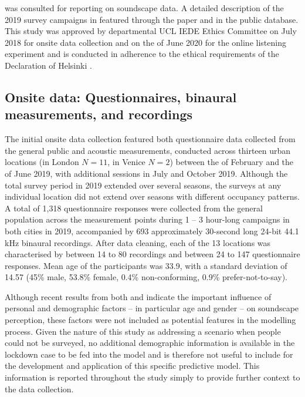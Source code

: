\citet{ISO12913Part2} was consulted for reporting on soundscape data. A detailed description of the 2019 survey campaigns in featured through the paper and in the public database. This study was approved by departmental UCL IEDE Ethics Committee on  July 2018 for onsite data collection and on the  of June 2020 for the online listening experiment and is conducted in adherence to the ethical requirements of the Declaration of Helsinki \citep{WMA2013World}.

 \subsection{Onsite data: Questionnaires, binaural measurements, and recordings}
   The initial onsite data collection featured both questionnaire data collected from the general public and acoustic measurements, conducted across thirteen urban locations (in London $N=11$, in Venice $N=2$) between the  of February and the  of June 2019, with additional sessions in July and October 2019. Although the total survey period in 2019 extended over several seasons, the surveys at any individual location did not extend over seasons with different occupancy patterns. A total of 1,318 questionnaire responses were collected from the general population across the measurement points during 1 -- 3 hour-long campaigns in both cities in 2019, accompanied by 693 approximately 30-second long 24-bit 44.1 kHz binaural recordings. After data cleaning, each of the 13 locations was characterised by between 14 to 80 recordings and between 24 to 147 questionnaire responses. Mean age of the participants was 33.9, with a standard deviation of 14.57 (45\% male, 53.8\% female, 0.4\% non-conforming, 0.9\% prefer-not-to-say).

   Although recent results from both \citet{Tarlao2020Investigating} and \citet{Erfanian2021Psychological} indicate the important influence of personal and demographic factors -- in particular age and gender -- on soundscape perception, these factors were not included as potential features in the modelling process. Given the nature of this study as addressing a scenario when people could not be surveyed, no additional demographic information is available in the lockdown case to be fed into the model and is therefore not useful to include for the development and application of this specific predictive model. This information is reported throughout the study simply to provide further context to the data collection.


